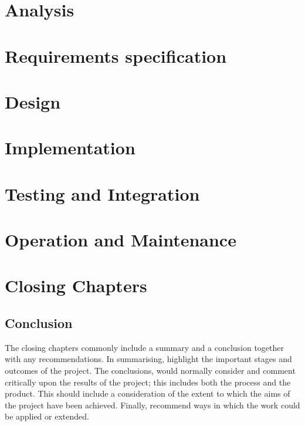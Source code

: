 \documentclass{report} %
\begin{document}
\cite{Tang_2018_CVPR_Workshops}
\cite{altham1962history}


\chapter{Analysis}


\chapter{Requirements specification}


\chapter{Design}

\chapter{Implementation}

\chapter{Testing and Integration}

\chapter{Operation and Maintenance}

\chapter{Closing Chapters}
\section{Conclusion}

The closing chapters commonly include a summary and a conclusion together with any recommendations. In summarising, highlight the important stages and outcomes of the project.  The conclusions, would normally consider and comment critically upon the results of the project; this includes both the process and the product.  This should include a consideration of the extent to which the aims of the project have been achieved.  Finally, recommend ways in which the work could be applied or extended.




\end{document}

